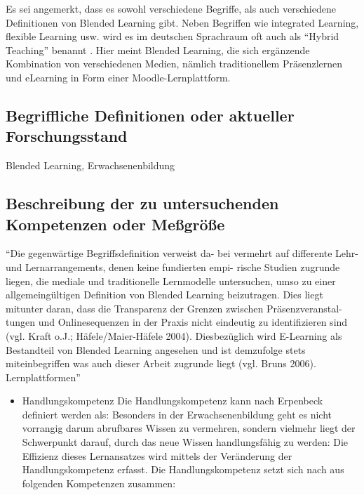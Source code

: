 \documentclass[12pt, bibliography=totoc]{scrartcl}
\begin{document}
Es sei angemerkt, dass es sowohl verschiedene Begriffe, als auch
verschiedene Definitionen von Blended Learning gibt. Neben Begriffen wie
integrated Learning, flexible Learning usw. wird es im deutschen
Sprachraum oft auch als \enquote{Hybrid Teaching} benannt
\parencite{Oliver2005,kerres2001multimediale }. Hier meint Blended
Learning, die sich ergänzende Kombination von verschiedenen Medien,
nämlich traditionellem Präsenzlernen und eLearning in Form einer
Moodle-Lernplattform.

\subsection{Begriffliche Definitionen oder aktueller
Forschungsstand}\label{begriffliche-definitionen-oder-aktueller-forschungsstand}

Blended Learning, Erwachsenenbildung

\subsection{Beschreibung der zu untersuchenden Kompetenzen oder
Meßgröße}\label{beschreibung-der-zu-untersuchenden-kompetenzen-oder-meuxdfgruxf6uxdfe}

\enquote{Die gegenwärtige Begriffsdefinition verweist da- bei vermehrt
auf differente Lehr- und Lernarrangements, denen keine fundierten empi-
rische Studien zugrunde liegen, die mediale und traditionelle
Lernmodelle untersuchen, umso zu einer allgemeingültigen Definition von
Blended Learning beizutragen. Dies liegt mitunter daran, dass die
Transparenz der Grenzen zwischen Präsenzveranstal- tungen und
Onlinesequenzen in der Praxis nicht eindeutig zu identifizieren sind
(vgl. Kraft o.J.; Häfele/Maier-Häfele 2004). Diesbezüglich wird
E-Learning als Bestandteil von Blended Learning angesehen und ist
demzufolge stets miteinbegriffen was auch dieser Arbeit zugrunde liegt
(vgl. Bruns 2006). Lernplattformen}\textcite{Maihack2015}

\begin{itemize}
\tightlist
\item
  Handlungskompetenz Die Handlungskompetenz kann nach Erpenbeck
  definiert werden als: 
  Besonders in der Erwachsenenbildung geht es nicht vorrangig darum
  abrufbares Wissen zu vermehren, sondern vielmehr liegt der Schwerpunkt
  darauf, durch das neue Wissen handlungsfähig zu werden:
  Die Effizienz dieses Lernansatzes wird mittels der Veränderung der
  Handlungskompetenz erfasst. Die Handlungskompetenz setzt sich nach
  \textcite{ErpenbeckRosenstiel200305} aus folgenden Kompetenzen
  zusammen:
\end{itemize}
\end{document}
